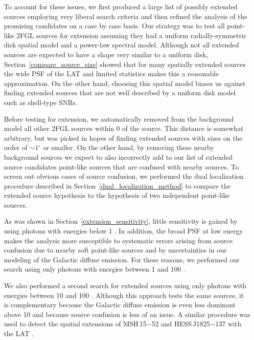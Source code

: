 \documentclass[12pt,preprint]{aastex}
\newcommand{\gev}{\text{GeV}\xspace}
\newcommand{\degree}{\ensuremath{^\circ}\xspace}
\begin{document}
To account for these issues, we first produced a large list of possibly
extended sources employing very liberal search criteria and then
refined the analysis of the promising candidates on a case by case basis.
Our strategy was to test all point-like 2FGL sources for extension assuming
they had a uniform radially-symmetric disk spatial model
and a power-law spectral model.  Although not all extended sources are
expected to have a shape very similar to a uniform disk, Section~\ref{compare_source_size} showed that for many spatially
extended sources the wide PSF of the LAT and limited statistics makes
this a reasonable approximation.  On the other hand, choosing this
spatial model biases us against finding extended sources that are not
well described by a uniform disk model such as shell-type SNRs.

Before testing for extension, we automatically removed from the background
model all other 2FGL sources within 0 of the source.  This distance
is somewhat arbitrary, but was picked in hopes of finding extended
sources with sizes on the order of $\sim1\degree$ or smaller. On the
other hand, by removing these nearby background sources we expect to
also incorrectly add to our list of extended source candidates
point-like sources that
are confused with nearby sources.  To screen out obvious cases of source
confusion, we performed the dual localization procedure described in
Section~\ref{dual_localization_method} to compare the extended source
hypothesis to the hypothesis of two independent point-like sources.

As was shown in Section~\ref{extension_sensitivity}, little sensitivity is gained by
using photons with energies below 1 \gev. In addition,
the broad PSF at low energy makes the analysis more susceptible to systematic
errors arising from source confusion due to nearby soft point-like sources
and by uncertainties in our modeling of the Galactic diffuse emission. 
For these reasons,
we performed our search using only photons with energies between 1 \gev
and 100 \gev.

We also performed a second search for extended sources using only
photons with energies between 10 \gev and 100 \gev.  Although this
approach tests the same sources, it is complementary because the Galactic
diffuse emission is even less dominant above 10 \gev and because source
confusion is less of an issue.  A similar procedure was used to detect
the spatial extensions of MSH\,15$-$52 and
HESS\,J1825$-$137 with the LAT \citep{msh1552,fermi_hess_j1825}.
\end{document}
